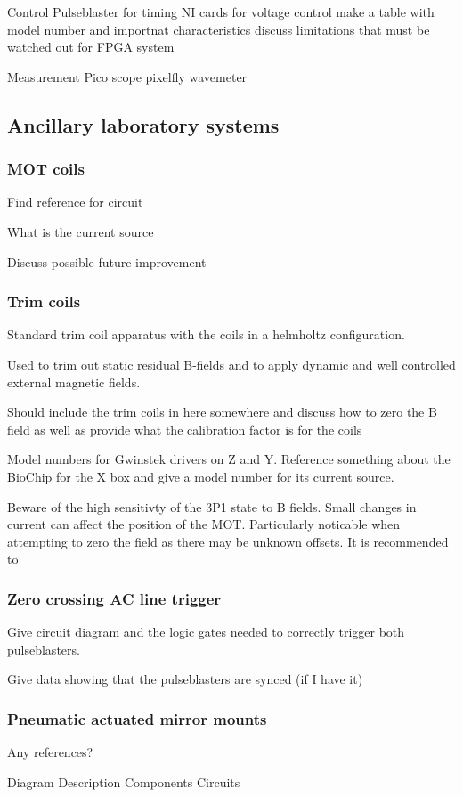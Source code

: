 Control
	Pulseblaster for timing
	NI cards for voltage control
		make a table with model number and importnat characteristics
		discuss limitations that must be watched out for
	FPGA system

Measurement
	Pico scope
	pixelfly
	wavemeter

\subsection{Ancillary laboratory systems} \label{ssec:misc_sys}

\subsubsection{MOT coils}

Find reference for circuit

What is the current source

Discuss possible future improvement

\subsubsection{Trim coils}

Standard trim coil apparatus with the coils in a helmholtz configuration.

Used to trim out static residual B-fields and to apply dynamic and well controlled external magnetic fields.

Should include the trim coils in here somewhere and discuss how to zero the B field as well as provide what the calibration factor is for the coils

Model numbers for Gwinstek drivers on Z and Y. Reference something about the BioChip for the X box and give a model number for its current source.

Beware of the high sensitivty of the 3P1 state to B fields. Small changes in current can affect the position of the MOT. Particularly noticable when attempting to zero the field as there may be unknown offsets. It is recommended to 

\subsubsection{Zero crossing AC line trigger}

Give circuit diagram and the logic gates needed to correctly trigger both pulseblasters.

Give data showing that the pulseblasters are synced (if I have it)

\subsubsection{Pneumatic actuated mirror mounts}

Any references?

Diagram
Description
Components
	Circuits
	

